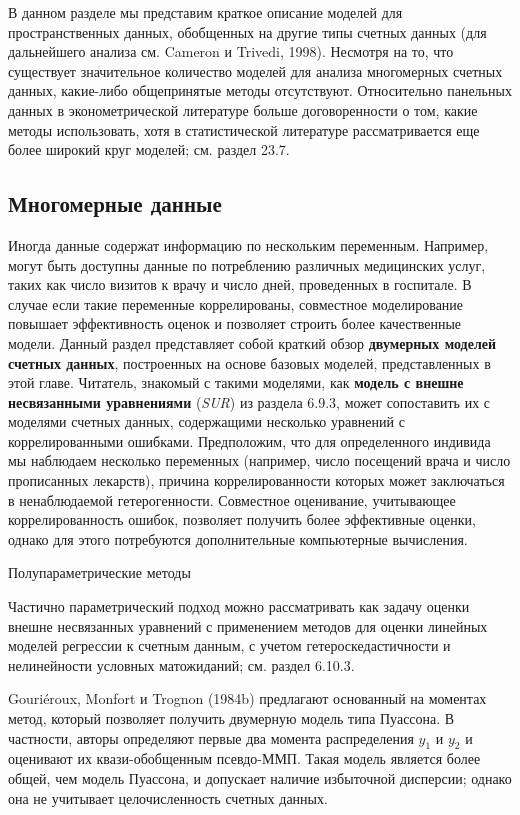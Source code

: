 \noindent
В данном разделе мы представим краткое описание моделей для пространственных данных, обобщенных на другие типы счетных данных (для дальнейшего анализа см. Cameron и Trivedi, 1998). Несмотря на то, что существует значительное количество моделей для анализа многомерных счетных данных, какие-либо общепринятые методы отсутствуют. Относительно панельных данных в эконометрической литературе больше договоренности о том, какие методы использовать, хотя в статистической литературе рассматривается еще более широкий круг моделей; см. раздел 23.7.


\subsection{Многомерные данные}\label{sec:20.6.1}

\noindent
Иногда данные содержат информацию по нескольким переменным. Например, могут быть доступны данные по потреблению различных медицинских услуг, таких как число визитов к врачу и число дней, проведенных в госпитале. В случае если такие переменные коррелированы, совместное моделирование повышает эффективность оценок и позволяет строить более качественные модели. Данный раздел представляет собой краткий обзор \textbf{двумерных моделей счетных данных}, построенных на основе базовых моделей, представленных в этой главе. Читатель, знакомый с такими моделями, как \textbf{модель с внешне несвязанными уравнениями} (\textit{SUR}) из раздела 6.9.3, может сопоставить их с моделями счетных данных, содержащими несколько уравнений с коррелированными ошибками. Предположим, что для определенного индивида мы наблюдаем несколько переменных (например, число посещений врача и число прописанных лекарств), причина коррелированности которых может заключаться в ненаблюдаемой гетерогенности. Совместное оценивание, учитывающее коррелированность ошибок, позволяет получить более эффективные оценки, однако для этого потребуются дополнительные компьютерные вычисления.

        \begin{center}{Полупараметрические методы}\end{center}
        \noindent
Частично параметрический подход можно рассматривать как задачу оценки внешне несвязанных уравнений с применением методов для оценки линейных моделей регрессии к счетным данным, с учетом гетероскедастичности и нелинейности условных матожиданий; см. раздел 6.10.3.

Gouri\'eroux, Monfort и Trognon (1984b) предлагают основанный на моментах метод, который позволяет получить двумерную модель типа Пуассона. В частности, авторы определяют первые два момента распределения $y_1$ и $y_2$ и оценивают их квази-обобщенным псевдо-ММП. Такая модель является более общей, чем модель Пуассона, и допускает наличие избыточной дисперсии; однако она не учитывает целочисленность счетных данных.


